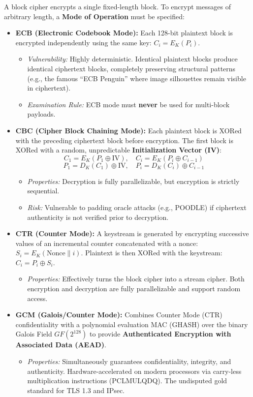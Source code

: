 A block cipher encrypts a single fixed-length block. To encrypt messages of arbitrary length, a \textbf{Mode of Operation} must be specified:

\begin{itemize}
\item \textbf{ECB (Electronic Codebook Mode):}
Each 128-bit plaintext block is encrypted independently using the same key: $C_i = E_K(P_i)$.
\begin{itemize}
\item \textit{Vulnerability:} Highly deterministic. Identical plaintext blocks produce identical ciphertext blocks, completely preserving structural patterns (e.g., the famous ``ECB Penguin'' where image silhouettes remain visible in ciphertext).
\item \textit{Examination Rule:} ECB mode must \textbf{never} be used for multi-block payloads.
\end{itemize}

\item \textbf{CBC (Cipher Block Chaining Mode):}
Each plaintext block is XORed with the preceding ciphertext block before encryption. The first block is XORed with a random, unpredictable \textbf{Initialization Vector (IV)}:
\[ C_1 = E_K(P_1 \oplus \text{IV}), \quad C_i = E_K(P_i \oplus C_{i-1}) \]
\[ P_1 = D_K(C_1) \oplus \text{IV}, \quad P_i = D_K(C_i) \oplus C_{i-1} \]
\begin{itemize}
\item \textit{Properties:} Decryption is fully parallelizable, but encryption is strictly sequential.
\item \textit{Risk:} Vulnerable to padding oracle attacks (e.g., POODLE) if ciphertext authenticity is not verified prior to decryption.
\end{itemize}

\item \textbf{CTR (Counter Mode):}
A keystream is generated by encrypting successive values of an incremental counter concatenated with a nonce: $S_i = E_K(\text{Nonce} \parallel i)$. Plaintext is then XORed with the keystream: $C_i = P_i \oplus S_i$.
\begin{itemize}
\item \textit{Properties:} Effectively turns the block cipher into a stream cipher. Both encryption and decryption are fully parallelizable and support random access.
\end{itemize}

\item \textbf{GCM (Galois/Counter Mode):}
Combines Counter Mode (CTR) confidentiality with a polynomial evaluation MAC (GHASH) over the binary Galois Field $GF(2^{128})$ to provide \textbf{Authenticated Encryption with Associated Data (AEAD)}.
\begin{itemize}
\item \textit{Properties:} Simultaneously guarantees confidentiality, integrity, and authenticity. Hardware-accelerated on modern processors via carry-less multiplication instructions (PCLMULQDQ). The undisputed gold standard for TLS 1.3 and IPsec.
\end{itemize}


\end{itemize}
